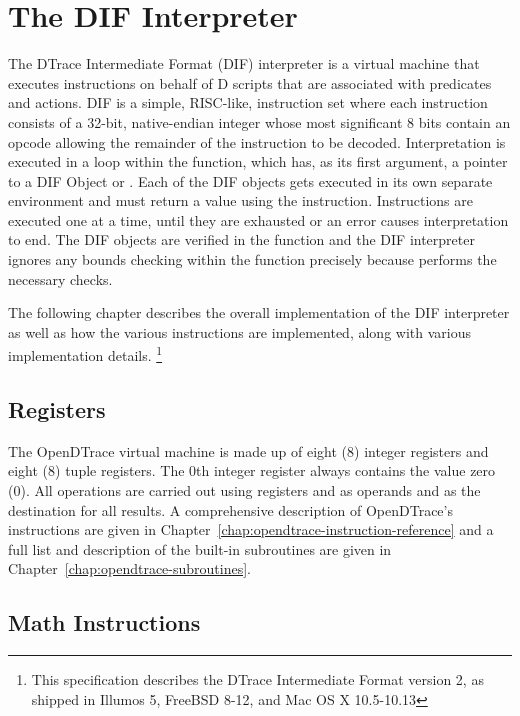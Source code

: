 \section{The DIF Interpreter}

The DTrace Intermediate Format (DIF) interpreter is a virtual machine
that executes instructions on behalf of D scripts that are associated
with predicates and actions.  DIF is a simple, RISC-like, instruction
set where each instruction consists of a 32-bit, native-endian integer
whose most significant 8 bits contain an opcode allowing the remainder
of the instruction to be decoded.  Interpretation is executed in a
loop within the  function, which has, as
its first argument, a pointer to a DIF Object or
. Each of the DIF objects gets executed in its
own separate environment and must return a value using the
 instruction. Instructions are executed one at a
time, until they are exhausted or an error causes interpretation to
end. The DIF objects are verified in the
 function and the DIF interpreter
ignores any bounds checking within the 
function precisely because  performs
the necessary checks.

The following chapter describes the overall implementation of the DIF
interpreter as well as how the various instructions are implemented,
along with various implementation details. \footnote{This
  specification describes the DTrace Intermediate Format version 2, as
  shipped in Illumos 5, FreeBSD 8-12, and Mac OS X 10.5-10.13}

\subsection{Registers}
\label{sec:dif-registers}

The OpenDTrace virtual machine is made up of eight (8) integer registers
and eight (8) tuple registers.  The 0th integer register always
contains the value zero (0).  All operations are carried out using
registers  and  as operands and
 as the destination for all results. A comprehensive
description of OpenDTrace's instructions are given in
Chapter~\ref{chap:opendtrace-instruction-reference} and a full list
and description of the built-in subroutines are given in
Chapter~\ref{chap:opendtrace-subroutines}.

\subsection{Math Instructions}
\label{sec:dif-math}

